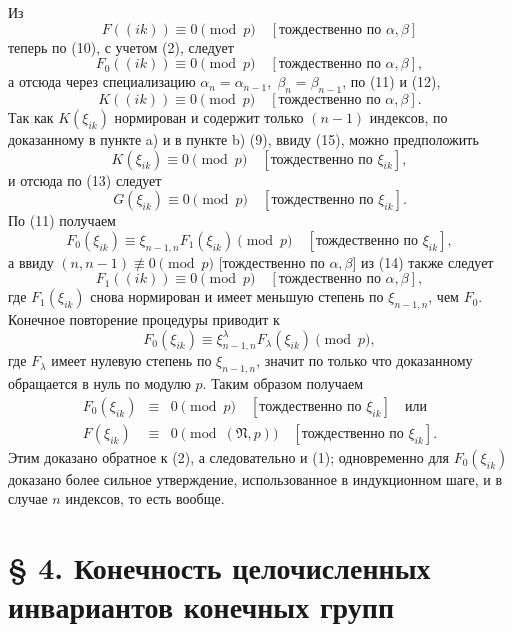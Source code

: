 \documentclass[11pt]{article}
\providecommand{\frN}{\mathfrak N}
\begin{document}
Из
\[
        F((ik))\equiv0\pmod p\quad [\text{тождественно по \(\alpha,\beta\)}]
\]
теперь по (10), с учетом (2), следует
\begin{equation}
        F_0((ik))\equiv0\pmod p\quad [\text{тождественно по \(\alpha,\beta\)}],
\end{equation}
а отсюда через специализацию \(\alpha_n=\alpha_{n-1},\;\beta_n=\beta_{n-1}\), по (11) и (12),
\begin{equation}
        K((ik))\equiv0\pmod p\quad [\text{тождественно по \(\alpha,\beta\)}].
\end{equation}
Так как \(K(\xi_{ik})\) нормирован и содержит только \((n-1)\) индексов, по доказанному в пункте a) и в пункте b) (9), ввиду (15), можно предположить
\[
        K(\xi_{ik})\equiv0\pmod p\quad [\text{тождественно по \(\xi_{ik}\)}],
\]
и отсюда по (13) следует
\[
        G(\xi_{ik})\equiv0\pmod p\quad [\text{тождественно по \(\xi_{ik}\)}].
\]
По (11) получаем
\[
        F_0(\xi_{ik})\equiv\xi_{n-1,n}F_1(\xi_{ik})\pmod p\quad [\text{тождественно по \(\xi_{ik}\)}],
\]
а ввиду \((n,n-1)\not\equiv0\pmod p\) [тождественно по \(\alpha,\beta\)] из (14) также следует
\[
        F_1((ik))\equiv0\pmod p\quad [\text{тождественно по \(\alpha,\beta\)}],
\]
где \(F_1(\xi_{ik})\) снова нормирован и имеет меньшую степень по \(\xi_{n-1,n}\), чем \(F_0\). Конечное повторение процедуры приводит к
\[
        F_0(\xi_{ik})\equiv\xi_{n-1,n}^{\lambda}F_\lambda(\xi_{ik})\pmod p,
\]
где \(F_\lambda\) имеет нулевую степень по \(\xi_{n-1,n}\), значит по только что доказанному обращается в нуль по модулю \(p\). Таким образом получаем
\begin{equation}
\begin{array}{rcl}
        F_0(\xi_{ik})&\equiv&0\pmod p\quad [\text{тождественно по \(\xi_{ik}\)}]\quad \text{или}\\
        F(\xi_{ik})&\equiv&0\pmod{(\frN,p)}\quad [\text{тождественно по \(\xi_{ik}\)}].
\end{array}
\end{equation}
Этим доказано обратное к (2), а следовательно и (1); одновременно для \(F_0(\xi_{ik})\) доказано более сильное утверждение, использованное в индукционном шаге, и в случае \(n\) индексов, то есть вообще.

\setcounter{equation}{0}
\section*{§ 4. Конечность целочисленных инвариантов конечных групп}
\end{document}
